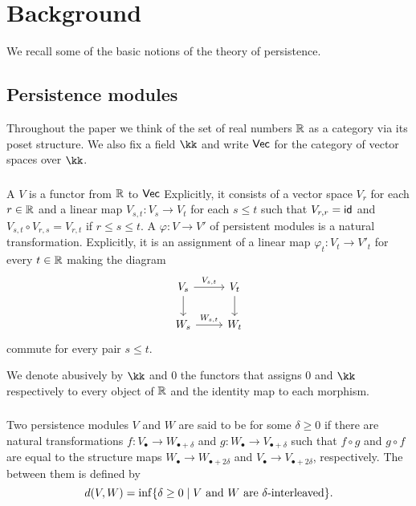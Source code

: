 
\section{Background}

We recall some of the basic notions of the theory of persistence.

\subsection{Persistence modules}

Throughout the paper we think of the set of real numbers $\R$ as a category via its poset structure.
We also fix a field $\kk$ and write $\Vec$ for the category of vector spaces over $\kk$.

\subsubsection{} A  $V$ is a functor from $\R$ to $\Vec$
Explicitly, it consists of a vector space $V_r$ for each $r \in \R$ and a linear map $V_{s,t} \colon V_s \to V_t$ for each $s \leq t$ such that $V_{r,r} = \id$ and
$V_{s,t} \circ V_{r,s} = V_{r,t}$ if $r \leq s \leq t$.
A  $\varphi \colon V \to V'$ of persistent modules is a natural transformation.
Explicitly, it is an assignment of a linear map $\varphi_t \colon V_t \to V'_t$ for every $t \in \R$ making the diagram
\begin{equation*}
	\begin{tikzcd}
		V_{s} \arrow[r, "V_{s,t}"] \arrow[d] & V_{t} \arrow[d] \\
		W_{s} \arrow[r, "W_{s,t}"] & W_{t}
	\end{tikzcd}
\end{equation*}
commute for every pair $s \leq t$.

We denote abusively by $\kk$ and $0$ the functors that assigns $0$ and $\kk$ respectively to every object of $\R$ and the identity map to each morphism.


\subsubsection{} Two persistence modules $V$ and $W$ are said to be  for some $\delta \geq 0$ if there are natural transformations $f \colon V_{\bullet} \to W_{\bullet + \delta}$ and $g \colon W_{\bullet} \to V_{\bullet + \delta}$ such that $f \circ g$ and $g \circ f$ are equal to the structure maps $W_{\bullet} \to W_{\bullet + 2\delta}$ and $V_{\bullet} \to V_{\bullet + 2\delta}$, respectively.
The  between them is defined by
\[
d(V, W) = \inf\set{\delta \geq 0 \mid V \text{ and } W \text{ are } \delta\text{-interleaved}}.
\]

